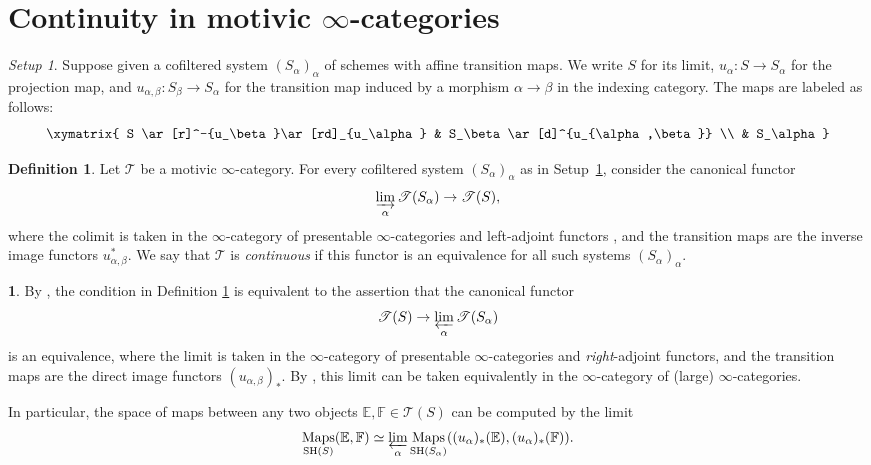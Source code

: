 \documentclass[JEP,XML,SOM,Unicode]{cedram}
\newcommand{\T}{\mathscr T}
\newcommand{\E}{\mathbb E}
\newcommand{\F}{\mathbb F}
\DeclareMathOperator{\SH}{SH}
\DeclareMathOperator{\Maps}{Maps}
\DeclareMathOperator{\ilim}{\varinjlim}
\DeclareMathOperator{\plim}{\varprojlim}
\theoremstyle{remark}
\newtheorem{setup}[thm]{Setup}
\theoremstyle{definition}
\newtheorem{df}[thm]{Definition}
\newtheorem{num}[thm]{}
\numberwithin{equation}{thm}
\begin{document}
\appendix
\section{Continuity in motivic \texorpdfstring{$\infty$}{∞}-categories}
\label{apd:continuity}

\begin{setup}\label{setup:continuity}
Suppose given a cofiltered system $(S_\alpha)_\alpha$ of schemes with affine transition maps.
We write $S$ for its limit, $u_\alpha : S \to S_\alpha$ for the projection map, and $u_{\alpha,\beta} : S_\beta \to S_\alpha$ for the transition map induced by a morphism $\alpha \to \beta$ in the indexing category. The maps are labeled as follows:
\[
\xymatrix{
S \ar[r]^-{u_\beta}\ar[rd]_{u_\alpha}
& S_\beta \ar[d]^{u_{\alpha,\beta}}
\\
& S_\alpha
}
\]
\end{setup}

\begin{df}\label{df:continuity}
Let $\T$ be a motivic $\infty$-category.
For every cofiltered system $(S_\alpha)_\alpha$ as in Setup~\ref{setup:continuity}, consider the canonical functor
\[
\ilim_\alpha \T(S_\alpha) \to \T(S),
\]
where the colimit is taken in the $\infty$-category of presentable $\infty$-categories and left-adjoint functors \cite[Def.\,5.5.3.1]{LurieHTT}, and the transition maps are the inverse image functors $u_{\alpha,\beta}^*$.
We say that $\T$ is \emph{continuous} if this functor is an equivalence for all such systems $(S_\alpha)_\alpha$.
\end{df}

\begin{num}\label{num:continuity lower star}
By \cite[Cor.\,5.5.3.4]{LurieHTT}, the condition in Definition \ref{df:continuity} is equivalent to the assertion that the canonical functor
\[
\T(S) \to \plim_\alpha \T(S_\alpha)
\]
is an equivalence, where the limit is taken in the $\infty$-category of presentable $\infty$-categories and \emph{right}-adjoint functors, and the transition maps are the direct image functors $(u_{\alpha,\beta})_*$.
By \cite[Th.\,5.5.3.18]{LurieHTT}, this limit can be taken equivalently in the $\infty$-category of (large) $\infty$-categories.

In particular, the space of maps between any two objects $\E,\F \in \T(S)$ can be computed by the limit
\[
\Maps_{\SH(S)}(\E, \F)
\simeq \plim_\alpha \Maps_{\SH(S_\alpha)}((u_\alpha)_*(\E), (u_\alpha)_*(\F)).
\]
\end{num}
\end{document}
